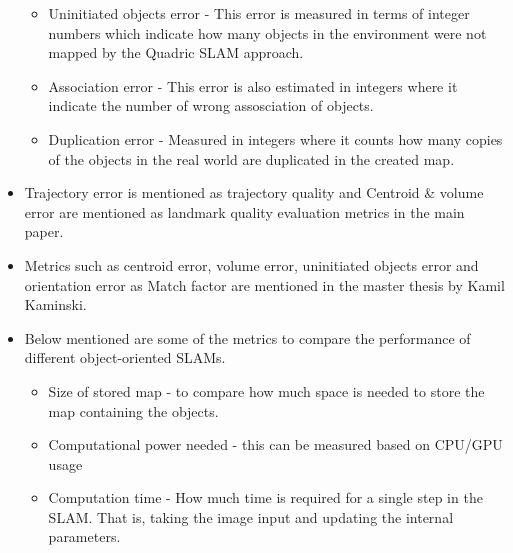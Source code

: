 \documentclass{article}
\begin{document}
\begin{itemize}
\begin{itemize}
    \item Uninitiated objects error - This error is measured in terms of integer numbers which indicate how many objects in the environment were not mapped by the Quadric SLAM approach.
    \item Association error - This error is also estimated in integers where it indicate the number of wrong assosciation of objects.
    \item Duplication error - Measured in integers where it counts how many copies of the objects in the real world are duplicated in the created map.
\end{itemize}
\item Trajectory error is mentioned as trajectory quality and Centroid \& volume error are mentioned as landmark quality evaluation metrics in the main paper\cite{sünderhauf2017dual}.
\item Metrics such as centroid error, volume error, uninitiated objects error and orientation error as Match factor are mentioned in the master thesis by Kamil Kaminski\cite{dataassosciation}.
\item Below mentioned are some of the metrics to compare the performance of different object-oriented SLAMs.
\begin{itemize}
    \item Size of stored map - to compare how much space is needed to store the map containing the objects. 
    \item Computational power needed - this can be measured based on CPU/GPU usage
    \item Computation time - How much time is required for a single step in the SLAM. That is, taking the image input and updating the internal parameters.
\end{itemize}
\end{itemize}
\end{document}
